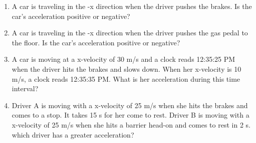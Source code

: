 \begin{description}
\begin{enumerate}
 \item A car is traveling in the -x direction when the driver pushes the brakes. Is the car's acceleration positive or negative?
 \item A car is traveling in the -x direction when the driver pushes the gas pedal to the floor. Is the car's acceleration positive or negative?
 \item A car is moving at a x-velocity of 30 m/s and a clock reads 12:35:25 PM when the driver hits the brakes and slows down. When her x-velocity is 10 m/s, a clock reads 12:35:35 PM. What is her acceleration during this time interval?
 \item Driver A is moving with a x-velocity of 25 m/s when she hits the brakes and comes to a stop. It takes 15 s for her come to rest. Driver B is moving with a x-velocity of 25 m/s when she hits a barrier head-on and comes to rest in 2  s. which driver has a greater acceleration?
\end{enumerate}
\end{description}

%






